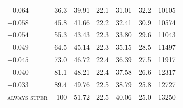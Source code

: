 \begin{table}[!t]
\begin{minipage}[t]{0.49\textwidth}
\begin{tabular}{lrrrrrr}
$+0.064$ & 36.3 & 39.91 & 22.1 & 31.01 & 32.2 & 10105\\
$+0.058$ & 45.8 & 41.66 & 22.2 & 32.41 & 30.9 & 10574\\
$+0.054$ & 55.3 & 43.43 & 22.3 & 33.80 & 29.6 & 11043\\
$+0.049$ & 64.5 & 45.14 & 22.3 & 35.15 & 28.5 & 11497\\
$+0.045$ & 73.0 & 46.72 & 22.4 & 36.39 & 27.5 & 11917\\
$+0.040$ & 81.1 & 48.21 & 22.4 & 37.58 & 26.6 & 12317\\
$+0.033$ & 89.4 & 49.76 & 22.5 & 38.79 & 25.8 & 12727\\
\textsc{always-super} & 100 & 51.72 & 22.5 & 40.06 & 25.0 & 13250\\
\bottomrule
\end{tabular}
\end{minipage}

\vspace{8pt}


\end{table}
